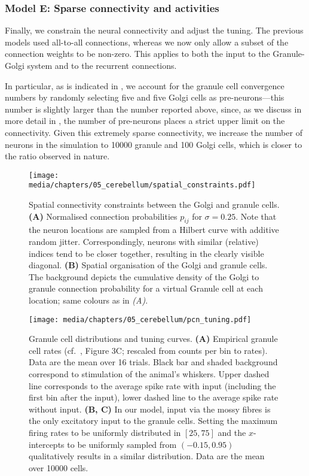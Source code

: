 \subsubsection{Model E: Sparse connectivity and activities}
Finally, we constrain the neural connectivity and adjust the \PCN tuning.
The previous models used all-to-all connections, whereas we now only allow a subset of the connection weights to be non-zero.
This applies to both the input to the Granule-Golgi system and to the recurrent connections.

In particular, as is indicated in , we account for the granule cell convergence numbers by randomly selecting five \PCN and five Golgi cells as pre-neurons---this number is slightly larger than the number reported above, since, as we discuss in more detail in , the number of pre-neurons places a strict upper limit on the connectivity. Given this extremely sparse connectivity, we increase the number of neurons in the simulation to \num{10000} granule and \num{100} Golgi cells, which is closer to the ratio observed in nature.

\begin{figure}
    \centering
    \texttt{[image: media/chapters/05\_cerebellum/spatial\_constraints.pdf]}
    \caption[Spatial connectivity constraints between the Golgi and granule cells]{Spatial connectivity constraints between the Golgi and granule cells.
    \textbf{(A)} Normalised connection probabilities $p_{ij}$ for $\sigma=0.25$. Note that the neuron locations are sampled from a Hilbert curve with additive random jitter. Correspondingly, neurons with similar (relative) indices tend to be closer together, resulting in the clearly visible diagonal.
    \textbf{(B)} Spatial organisation of the Golgi and granule cells. The background depicts the cumulative density of the Golgi to granule connection probability for a virtual Granule cell at each location; same colours as in \emph{(A)}.}
    \label{fig:spatial_constraints}
\end{figure}

\begin{figure}
	\centering
    \texttt{[image: media/chapters/05\_cerebellum/pcn\_tuning.pdf]}
    \caption[Granule cell EPSC distributions and PCN tuning curves]{Granule cell \EPSC distributions and \PCN tuning curves.
    \textbf{(A)} Empirical granule cell \EPSC rates (cf.~\cite{chadderton2004integration}, Figure 3C; rescaled from counts per bin to rates).
    Data are the mean over 16 trials.
    Black bar and shaded background correspond to stimulation of the animal's whiskers.
    Upper dashed line corresponds to the average spike rate with input (including the first bin after the input), lower dashed line to the average spike rate without input.
    \textbf{(B, C)} In our model, \PCN input via the mossy fibres is the only excitatory input to the granule cells. Setting the maximum firing rates to be uniformly distributed in $[25, 75]$ and the $x$-intercepts to be uniformly sampled from $(-0.15, 0.95)$ qualitatively results in a similar \EPSC distribution. Data are the mean over \num{10000} cells.
    }
    \label{fig:pcn_tuning}
\end{figure}

